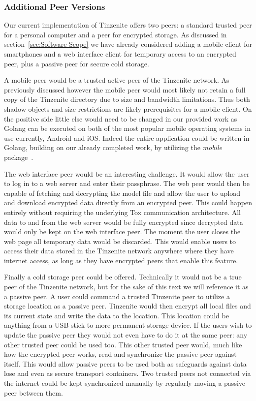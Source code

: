 \subsubsection{Additional Peer Versions}
\label{subs:Additional Peer Versions}

Our current implementation of Tinzenite offers two peers: a standard trusted peer for a personal computer and a peer for encrypted storage.
As discussed in section~\ref{sec:Software Scope} we have already considered adding a mobile client for smartphones and a web interface client for temporary access to an encrypted peer, plus a passive peer for secure cold storage.

A mobile peer would be a trusted active peer of the Tinzenite network.
As previously discussed however the mobile peer would most likely not retain a full copy of the Tinzenite directory due to size and bandwidth limitations.
Thus both shadow objects and size restrictions are likely prerequisites for a mobile client.
On the positive side little else would need to be changed in our provided work as Golang can be executed on both of the most popular mobile operating systems in use currently, Android and iOS.
Indeed the entire application could be written in Golang, building on our already completed work, by utilizing the \emph{mobile} package~\cite{web:site:golang:mobile}.

The web interface peer would be an interesting challenge.
It would allow the user to log in to a web server and enter their passphrase.
The web peer would then be capable of fetching and decrypting the model file and allow the user to upload and download encrypted data directly from an encrypted peer.
This could happen entirely without requiring the underlying Tox communication architecture.
All data to and from the web server would be fully encrypted since decrypted data would only be kept on the web interface peer.
The moment the user closes the web page all temporary data would be discarded.
This would enable users to access their data stored in the Tinzenite network anywhere where they have internet access, as long as they have encrypted peers that enable this feature.

Finally a cold storage peer could be offered.
Technically it would not be a true peer of the Tinzenite network, but for the sake of this text we will reference it as a passive peer.
A user could command a trusted Tinzenite peer to utilize a storage location as a passive peer.
Tinzenite would then encrypt all local files and its current state and write the data to the location.
This location could be anything from a USB stick to more permanent storage device.
If the users wish to update the passive peer they would not even have to do it at the same peer: any other trusted peer could be used too.
This other trusted peer would, much like how the encrypted peer works, read and synchronize the passive peer against itself.
This would allow passive peers to be used both as safeguards against data lose and even as secure transport containers.
Two trusted peers not connected via the internet could be kept synchronized manually by regularly moving a passive peer between them.

